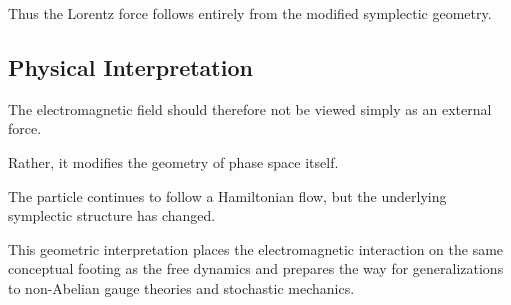 Thus the Lorentz force follows entirely from the modified symplectic
geometry.


\subsection{Physical Interpretation}

The electromagnetic field should therefore not be viewed simply as an
external force.

Rather, it modifies the geometry of phase space itself.

The particle continues to follow a Hamiltonian flow, but the underlying
symplectic structure has changed.

This geometric interpretation places the electromagnetic interaction on
the same conceptual footing as the free dynamics and prepares the way
for generalizations to non-Abelian gauge theories and stochastic
mechanics.



